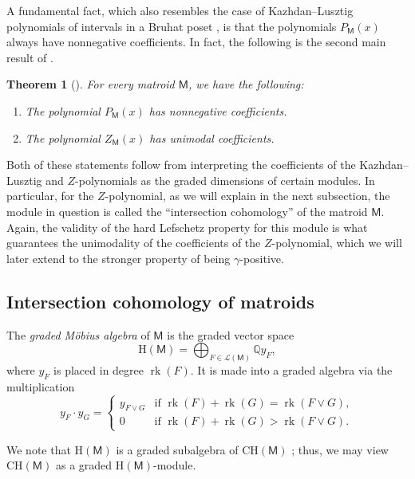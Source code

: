 \documentclass[11pt, a4paper, english]{amsart}
\theoremstyle{teoremas}
\newtheorem{theorem}{Theorem}[section]
\theoremstyle{definition}
\DeclareMathOperator{\rk}{rk}
\newcommand{\M}{\mathsf{M}}
\newcommand{\Q}{\mathbb{Q}}
\renewcommand{\H}{\mathrm{H}}
\newcommand{\CH}{\mathrm{CH}}
\newcommand{\cL}{\mathcal{L}}
\begin{document}
A fundamental fact, which also resembles the case of Kazhdan--Lusztig polynomials of intervals in a Bruhat poset \cite{elias-williamson}, is that the polynomials $P_{\M}(x)$ always have nonnegative coefficients. In fact, the following is the second main result of \cite{braden-huh-matherne-proudfoot-wang}.

\begin{theorem}[{\cite[Theorem~1.2]{braden-huh-matherne-proudfoot-wang}}]
    For every matroid $\M$, we have the following:
    \begin{enumerate}[\normalfont(i)]
        \item The polynomial $P_{\M}(x)$ has nonnegative coefficients.
        \item The polynomial $Z_{\M}(x)$ has unimodal coefficients.
    \end{enumerate}
\end{theorem}

Both of these statements follow from interpreting the coefficients of the Kazhdan--Lusztig and $Z$-polynomials as the graded dimensions of certain modules. In particular, for the $Z$-polynomial, as we will explain in the next subsection, the module in question is called the ``intersection cohomology'' of the matroid $\M$. Again, the validity of the hard Lefschetz property for this module is what guarantees the unimodality of the coefficients of the $Z$-polynomial, which we will later extend to the stronger property of being $\gamma$-positive.


\subsection{Intersection cohomology of matroids}\label{subsec:ih}

The \textit{graded M\"obius algebra} of $\M$ is the graded vector space
\[
\H(\M) = \bigoplus_{F \in \cL(\M)} \Q y_F,
\]
where $y_F$ is placed in degree $\rk(F)$.  It is made into a graded algebra via the multiplication
\[
y_F \cdot y_G = \begin{cases}y_{F \vee G} & \text{if $\rk(F) + \rk(G) = \rk(F \vee G)$},\\ 0 & \text{if $\rk(F) + \rk(G) > \rk (F \vee G)$}.\end{cases} 
\]

We note that $\H(\M)$ is a graded subalgebra of $\CH(\M)$ \cite[Proposition~2.18]{semismall}; thus, we may view $\CH(\M)$ as a graded $\H(\M)$-module.
\end{document}
